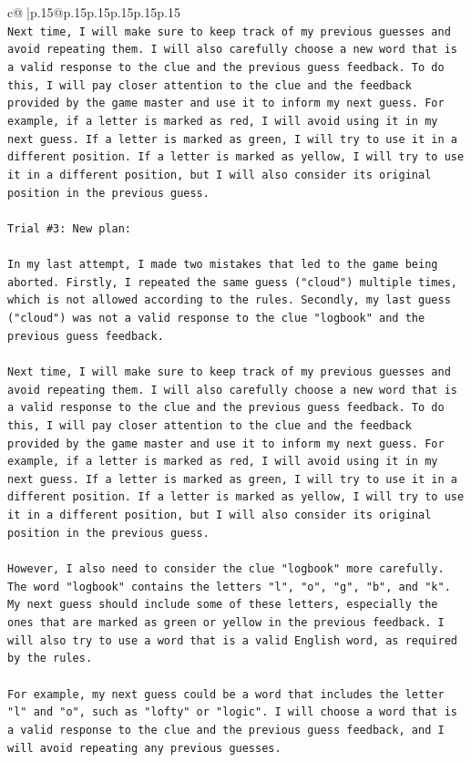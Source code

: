 \documentclass{article}
\begin{document}
{\begin{supertabular}{c@{$\;$}|p{.15\linewidth}@{}p{.15\linewidth}p{.15\linewidth}p{.15\linewidth}p{.15\linewidth}p{.15\linewidth}}
{{{\\ 
\texttt{Next time, I will make sure to keep track of my previous guesses and avoid repeating them. I will also carefully choose a new word that is a valid response to the clue and the previous guess feedback. To do this, I will pay closer attention to the clue and the feedback provided by the game master and use it to inform my next guess. For example, if a letter is marked as red, I will avoid using it in my next guess. If a letter is marked as green, I will try to use it in a different position. If a letter is marked as yellow, I will try to use it in a different position, but I will also consider its original position in the previous guess.} \\
\\ 
\texttt{Trial \#3: New plan: } \\
\\ 
\texttt{In my last attempt, I made two mistakes that led to the game being aborted. Firstly, I repeated the same guess ("cloud") multiple times, which is not allowed according to the rules. Secondly, my last guess ("cloud") was not a valid response to the clue "logbook" and the previous guess feedback. } \\
\\ 
\texttt{Next time, I will make sure to keep track of my previous guesses and avoid repeating them. I will also carefully choose a new word that is a valid response to the clue and the previous guess feedback. To do this, I will pay closer attention to the clue and the feedback provided by the game master and use it to inform my next guess. For example, if a letter is marked as red, I will avoid using it in my next guess. If a letter is marked as green, I will try to use it in a different position. If a letter is marked as yellow, I will try to use it in a different position, but I will also consider its original position in the previous guess.} \\
\\ 
\texttt{However, I also need to consider the clue "logbook" more carefully. The word "logbook" contains the letters "l", "o", "g", "b", and "k". My next guess should include some of these letters, especially the ones that are marked as green or yellow in the previous feedback. I will also try to use a word that is a valid English word, as required by the rules. } \\
\\ 
\texttt{For example, my next guess could be a word that includes the letter "l" and "o", such as "lofty" or "logic". I will choose a word that is a valid response to the clue and the previous guess feedback, and I will avoid repeating any previous guesses.} \\
}}}
\end{supertabular}}
\end{document}
